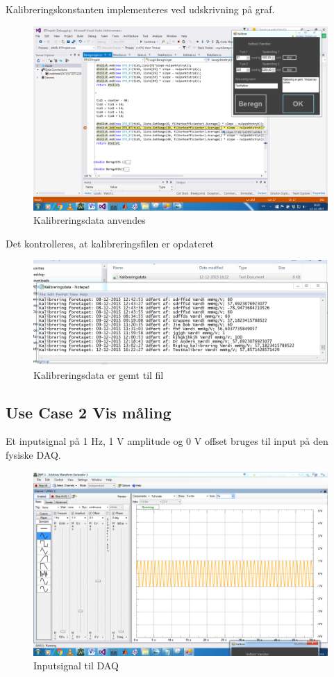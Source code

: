 Kalibreringskonstanten implementeres ved udskrivning på graf.
\begin{figure}[H]
	\centering
	\includegraphics[width=1\textwidth]{Figurer/Test_Kalibrer_3}
	\caption{Kalibreringsdata anvendes}
\end{figure}
Det kontrolleres, at kalibreringsfilen er opdateret
\begin{figure}[H]
	\centering
	\includegraphics[width=1\textwidth]{Figurer/Test_Kalibrer_4}
	\caption{Kalibreringsdata er gemt til fil}
\end{figure}

\subsection{Use Case 2 Vis måling}
Et inputsignal på 1 Hz, 1 V amplitude og 0 V offset bruges til input på den fysiske DAQ. 
\begin{figure}[H]
	\centering
	\includegraphics[width=1\textwidth]{Figurer/Test_Vis_1}
	\caption{Inputsignal til DAQ}
\end{figure}

